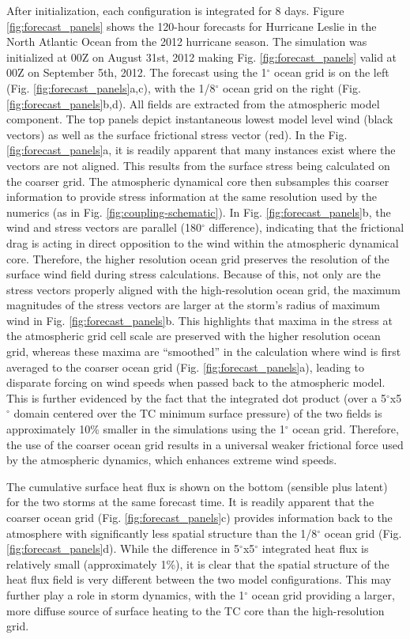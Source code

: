 \documentclass[draft,ms]{AGUTeX}
\newcommand{\degree}{$^{\circ}$}
\begin{document}
\begin{article}
After initialization, each configuration is integrated for 8 days. Figure \ref{fig:forecast_panels} shows the 120-hour forecasts for Hurricane Leslie in the North Atlantic Ocean from the 2012 hurricane season. The simulation was initialized at 00Z on August 31st, 2012 making Fig. \ref{fig:forecast_panels} valid at 00Z on September 5th, 2012. The forecast using the 1\degree{} ocean grid is on the left (Fig. \ref{fig:forecast_panels}a,c), with the 1/8\degree{} ocean grid on the right (Fig. \ref{fig:forecast_panels}b,d). All fields are extracted from the atmospheric model component. The top panels depict instantaneous lowest model level wind (black vectors) as well as the surface frictional stress vector (red). In the Fig. \ref{fig:forecast_panels}a, it is readily apparent that many instances exist where the vectors are not aligned. This results from the surface stress being calculated on the coarser grid. The atmospheric dynamical core then subsamples this coarser information to provide stress information at the same resolution used by the numerics (as in Fig. \ref{fig:coupling-schematic}). In Fig. \ref{fig:forecast_panels}b, the wind and stress vectors are parallel (180\degree{} difference), indicating that the frictional drag is acting in direct opposition to the wind within the atmospheric dynamical core. Therefore, the higher resolution ocean grid preserves the resolution of the surface wind field during stress calculations. Because of this, not only are the stress vectors properly aligned with the high-resolution ocean grid, the maximum magnitudes of the stress vectors are larger at the storm's radius of maximum wind in Fig. \ref{fig:forecast_panels}b. This highlights that maxima in the stress at the atmospheric grid cell scale are preserved with the higher resolution ocean grid, whereas these maxima are ``smoothed'' in the calculation where wind is first averaged to the coarser ocean grid (Fig. \ref{fig:forecast_panels}a), leading to disparate forcing on wind speeds when passed back to the atmospheric model. This is further evidenced by the fact that the integrated dot product (over a 5\degree{}x5\degree{} domain centered over the TC minimum surface pressure) of the two fields is approximately 10\% smaller in the simulations using the 1\degree{} ocean grid. Therefore, the use of the coarser ocean grid results in a universal weaker frictional force used by the atmospheric dynamics, which enhances extreme wind speeds.

The cumulative surface heat flux is shown on the bottom (sensible plus latent) for the two storms at the same forecast time. It is readily apparent that the coarser ocean grid (Fig. \ref{fig:forecast_panels}c) provides information back to the atmosphere with significantly less spatial structure than the 1/8\degree{} ocean grid (Fig. \ref{fig:forecast_panels}d). While the difference in 5\degree{}x5\degree{} integrated heat flux is relatively small (approximately 1\%), it is clear that the spatial structure of the heat flux field is very different between the two model configurations. This may further play a role in storm dynamics, with the 1\degree{} ocean grid providing a larger, more diffuse source of surface heating to the TC core than the high-resolution grid.


\end{article}
\end{document}
